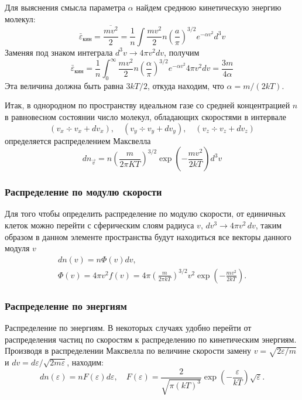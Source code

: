 Для выяснения смысла параметра $\alpha$ найдем среднюю кинетическую энергию молекул:
\begin{equation*}
\bar{\varepsilon}_{\text{кин}}=\frac{\overline{m v^2}}{2}=\frac{1}{n} \int \frac{m v^2}{2} n\left(\frac{a}{\pi}\right)^{3 / 2} e^{-\alpha v^2} d^3 v
\end{equation*}
Заменяя под знаком интеграла $d^3 v \rightarrow 4 \pi v^2 d v$, получим
\begin{equation*}
\bar{\varepsilon}_{\text{кин}}=\frac{1}{n} \int_0^{\infty} \frac{m v^2}{2} n\left(\frac{\alpha}{\pi}\right)^{3 / 2} e^{-\alpha v^2} 4 \pi v^2 d v=\frac{3 m}{4 \alpha}
\end{equation*}
Эта величина должна быть равна $3 k T / 2$, откуда находим, что $\alpha=m /(2 k T)$.

Итак, в однородном по пространству идеальном газе со средней концентрацией $n$ в равновесном состоянии число молекул, обладающих скоростями в интервале
\begin{equation*}
(v_x \div v_x+d v_x), \quad (v_y \div v_y+d v_y), \quad (v_z \div v_z+d v_z)
\end{equation*}
определяется распределением Максвелла
\begin{equation}
d n_{\vec{v}}=n\left(\frac{m}{2 \pi K T}\right)^{3 / 2} \exp \left(-\frac{m v^2}{2 k T}\right) d^3 v
\end{equation}

\subsubsection{Распределение по модулю скорости}
Для того чтобы определить распределение по модулю скорости, от единичных клеток можно перейти с сферическим слоям радиуса $v, \, dv^3 \rightarrow 4 \pi v^2 \, dv$, таким образом в данном элементе пространства будут находиться все векторы данного модуля $v$
\begin{gather}
\nonumber d n(v)=n \Phi(v) d v,\\ 
\Phi(v)=4 \pi v^2 f(v)=4 \pi\left(\frac{m}{2 \pi k T}\right)^{3 / 2} v^2 \exp \left(-\frac{m v^2}{2 k T}\right).
\end{gather}

\subsubsection{Распределение по энергиям}
Распределение по энергиям. В некоторых случаях удобно перейти от распределения частиц по скоростям к распределению по кинетическим энергиям. Производя в распределении Максвелла по величине скорости замену $v=\sqrt{2 \varepsilon / m}$ и $d v=d \varepsilon / \sqrt{2 m \varepsilon}$, находим:
\begin{equation}
d n(\varepsilon)=n F(\varepsilon) d \varepsilon, \quad F(\varepsilon)=\frac{2}{\sqrt{\pi(k T)^3}} \exp \left(-\frac{\varepsilon}{k T}\right) \sqrt{\varepsilon}.
\end{equation}

